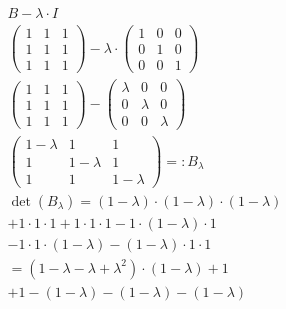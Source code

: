\begin{align*}
    B - \lambda \cdot I                                                              \\
    \begin{pmatrix}
        1 & 1 & 1 \\
        1 & 1 & 1 \\
        1 & 1 & 1
    \end{pmatrix} - \lambda \cdot \begin{pmatrix}
                                      1 & 0 & 0 \\
                                      0 & 1 & 0 \\
                                      0 & 0 & 1
                                  \end{pmatrix}                                     \\
    \begin{pmatrix}
        1 & 1 & 1 \\
        1 & 1 & 1 \\
        1 & 1 & 1
    \end{pmatrix} - \begin{pmatrix}
                        \lambda & 0       & 0       \\
                        0       & \lambda & 0       \\
                        0       & 0       & \lambda
                    \end{pmatrix}                                      \\
    \begin{pmatrix}
        1 - \lambda & 1           & 1           \\
        1           & 1 - \lambda & 1           \\
        1           & 1           & 1 - \lambda
    \end{pmatrix} =: B_\lambda                                          \\
    \det(B_\lambda) = (1 - \lambda) \cdot (1 - \lambda) \cdot (1 - \lambda)          \\
    + 1 \cdot 1 \cdot 1 + 1 \cdot 1 \cdot 1 - 1 \cdot (1 - \lambda) \cdot 1          \\
    - 1 \cdot 1 \cdot (1 - \lambda) - (1 - \lambda) \cdot 1 \cdot 1                  \\
    = (1 -\lambda - \lambda + \lambda^2) \cdot (1 - \lambda) + 1                     \\
    + 1 - (1 - \lambda) - (1 - \lambda) - (1 - \lambda)                              \\

\end{align*}
